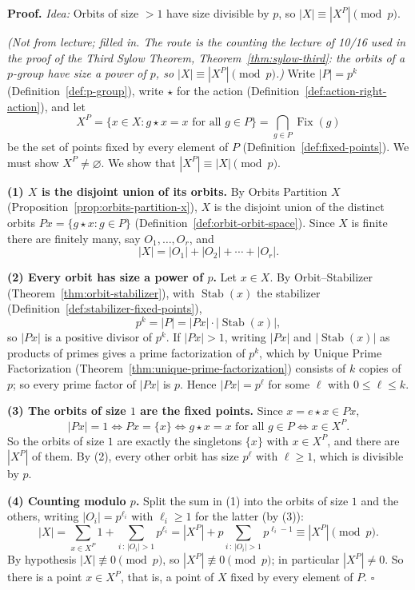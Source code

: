 \documentclass[11pt]{report}
\renewenvironment{proof}[1][Proof]{\noindent\textbf{#1.} }{\hfill$\square$\par\vspace{5pt}}
\begin{document}
\begin{proof}
\textit{Idea:} Orbits of size $> 1$ have size divisible by $p$, so $|X| \equiv |X^P| \pmod p$.\par
\textit{(Not from lecture; filled in. The route is the counting the lecture of 10/16 used in the proof of the Third Sylow Theorem, Theorem~\ref{thm:sylow-third}: the orbits of a $p$-group have size a power of $p$, so $|X| \equiv |X^P| \pmod p$.)} Write $|P| = p^k$ (Definition~\ref{def:p-group}), write $\star$ for the action (Definition~\ref{def:action-right-action}), and let
\[ X^P = \{ x \in X : g \star x = x \text{ for all } g \in P \} = \bigcap_{g \in P} \operatorname{Fix}(g) \]
be the set of points fixed by every element of $P$ (Definition~\ref{def:fixed-points}). We must show $X^P \neq \varnothing$. We show that $|X^P| \equiv |X| \pmod p$.

\textbf{(1) $X$ is the disjoint union of its orbits.} By Orbits Partition $X$ (Proposition~\ref{prop:orbits-partition-x}), $X$ is the disjoint union of the distinct orbits $Px = \{ g \star x : g \in P \}$ (Definition~\ref{def:orbit-orbit-space}). Since $X$ is finite there are finitely many, say $O_1, \ldots, O_r$, and
\[ |X| = |O_1| + |O_2| + \cdots + |O_r|. \]

\textbf{(2) Every orbit has size a power of $p$.} Let $x \in X$. By Orbit--Stabilizer (Theorem~\ref{thm:orbit-stabilizer}), with $\operatorname{Stab}(x)$ the stabilizer (Definition~\ref{def:stabilizer-fixed-points}),
\[ p^k = |P| = |Px| \cdot |\operatorname{Stab}(x)|, \]
so $|Px|$ is a positive divisor of $p^k$. If $|Px| > 1$, writing $|Px|$ and $|\operatorname{Stab}(x)|$ as products of primes gives a prime factorization of $p^k$, which by Unique Prime Factorization (Theorem~\ref{thm:unique-prime-factorization}) consists of $k$ copies of $p$; so every prime factor of $|Px|$ is $p$. Hence $|Px| = p^\ell$ for some $\ell$ with $0 \leq \ell \leq k$.

\textbf{(3) The orbits of size $1$ are the fixed points.} Since $x = e \star x \in Px$,
\[ |Px| = 1 \iff Px = \{x\} \iff g \star x = x \text{ for all } g \in P \iff x \in X^P. \]
So the orbits of size $1$ are exactly the singletons $\{x\}$ with $x \in X^P$, and there are $|X^P|$ of them. By (2), every other orbit has size $p^\ell$ with $\ell \geq 1$, which is divisible by $p$.

\textbf{(4) Counting modulo $p$.} Split the sum in (1) into the orbits of size $1$ and the others, writing $|O_i| = p^{\ell_i}$ with $\ell_i \geq 1$ for the latter (by (3)):
\[ |X| = \sum_{x \in X^P} 1 + \sum_{i \,:\, |O_i| > 1} p^{\ell_i} = |X^P| + p \sum_{i \,:\, |O_i| > 1} p^{\ell_i - 1} \equiv |X^P| \pmod p. \]
By hypothesis $|X| \not\equiv 0 \pmod p$, so $|X^P| \not\equiv 0 \pmod p$; in particular $|X^P| \neq 0$. So there is a point $x \in X^P$, that is, a point of $X$ fixed by every element of $P$.
\end{proof}
\end{document}
